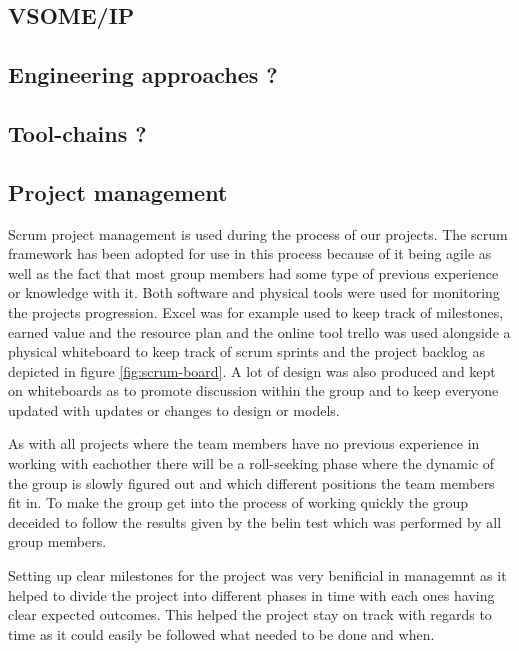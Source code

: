 \documentclass[11pt, titlepage]{article} %
\begin{document}
\subsection{VSOME/IP}
\subsection{Engineering approaches ?}
\subsection{Tool-chains ?}
\subsection{Project management}
Scrum project management is used during the process of our projects.
The scrum framework has been adopted for use in this process because of it being agile as well as the fact that most group members had some type of previous experience or knowledge with it. Both software and physical tools were used for monitoring the projects progression. Excel was for example used to keep track of milestones, earned value and the resource plan and the online tool trello was used alongside a physical whiteboard to keep track of scrum sprints and the project backlog as depicted in figure \ref{fig:scrum-board}. A lot of design was also produced and kept on whiteboards as to promote discussion within the group and to keep everyone updated with updates or changes to design or models.

As with all projects where the team members have no previous experience in working with eachother there will be a roll-seeking phase where the dynamic of the group is slowly figured out and which different positions the team members fit in. To make the group get into the process of working quickly the group deceided to follow the results given by the belin test which was performed by all group members.

Setting up clear milestones for the project was very benificial in managemnt as it helped to divide the project into different phases in time with each ones having clear expected outcomes. This helped the project stay on track with regards to time as it could easily be followed what needed to be done and when.
\end{document}
